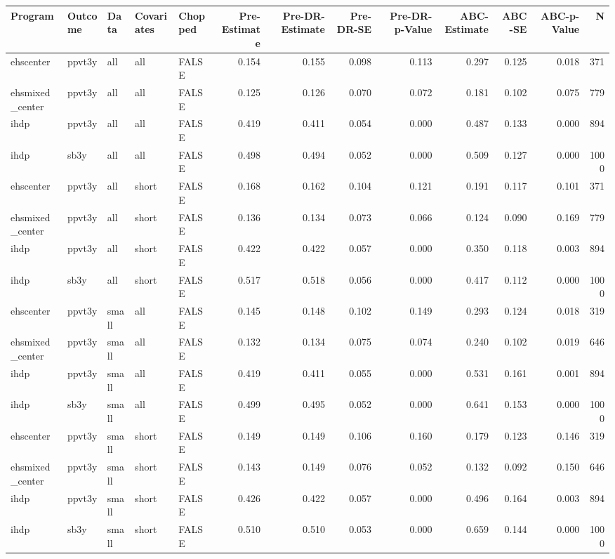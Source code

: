 \begin{table}[ht]
\centering
\begin{tabular}{lllllrrrrrrrr}
  \hline
Program & Outcome & Data & Covariates & Chopped & Pre-Estimate & Pre-DR-Estimate & Pre-DR-SE & Pre-DR-p-Value & ABC-Estimate & ABC-SE & ABC-p-Value & N \\ 
  \hline
ehscenter & ppvt3y & all & all & FALSE & 0.154 & 0.155 & 0.098 & 0.113 & 0.297 & 0.125 & 0.018 & 371 \\ 
  ehsmixed\_center & ppvt3y & all & all & FALSE & 0.125 & 0.126 & 0.070 & 0.072 & 0.181 & 0.102 & 0.075 & 779 \\ 
  ihdp & ppvt3y & all & all & FALSE & 0.419 & 0.411 & 0.054 & 0.000 & 0.487 & 0.133 & 0.000 & 894 \\ 
  ihdp & sb3y & all & all & FALSE & 0.498 & 0.494 & 0.052 & 0.000 & 0.509 & 0.127 & 0.000 & 1000 \\ 
  ehscenter & ppvt3y & all & short & FALSE & 0.168 & 0.162 & 0.104 & 0.121 & 0.191 & 0.117 & 0.101 & 371 \\ 
  ehsmixed\_center & ppvt3y & all & short & FALSE & 0.136 & 0.134 & 0.073 & 0.066 & 0.124 & 0.090 & 0.169 & 779 \\ 
  ihdp & ppvt3y & all & short & FALSE & 0.422 & 0.422 & 0.057 & 0.000 & 0.350 & 0.118 & 0.003 & 894 \\ 
  ihdp & sb3y & all & short & FALSE & 0.517 & 0.518 & 0.056 & 0.000 & 0.417 & 0.112 & 0.000 & 1000 \\ 
  ehscenter & ppvt3y & small & all & FALSE & 0.145 & 0.148 & 0.102 & 0.149 & 0.293 & 0.124 & 0.018 & 319 \\ 
  ehsmixed\_center & ppvt3y & small & all & FALSE & 0.132 & 0.134 & 0.075 & 0.074 & 0.240 & 0.102 & 0.019 & 646 \\ 
  ihdp & ppvt3y & small & all & FALSE & 0.419 & 0.411 & 0.055 & 0.000 & 0.531 & 0.161 & 0.001 & 894 \\ 
  ihdp & sb3y & small & all & FALSE & 0.499 & 0.495 & 0.052 & 0.000 & 0.641 & 0.153 & 0.000 & 1000 \\ 
  ehscenter & ppvt3y & small & short & FALSE & 0.149 & 0.149 & 0.106 & 0.160 & 0.179 & 0.123 & 0.146 & 319 \\ 
  ehsmixed\_center & ppvt3y & small & short & FALSE & 0.143 & 0.149 & 0.076 & 0.052 & 0.132 & 0.092 & 0.150 & 646 \\ 
  ihdp & ppvt3y & small & short & FALSE & 0.426 & 0.422 & 0.057 & 0.000 & 0.496 & 0.164 & 0.003 & 894 \\ 
  ihdp & sb3y & small & short & FALSE & 0.510 & 0.510 & 0.053 & 0.000 & 0.659 & 0.144 & 0.000 & 1000 \\ 

\end{tabular}
\end{table}
